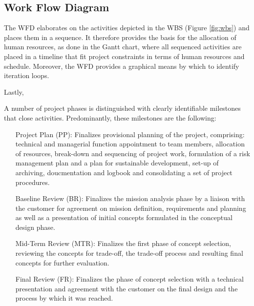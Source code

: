 \subsection{Work Flow Diagram}\label{cha:WFD}
The WFD elaborates on the activities depicted in the WBS (Figure \ref{fig:wbs}) and places them in a sequence. It therefore provides the basis for the allocation of human resources, as done in the Gantt chart, where all sequenced activities are placed in a timeline that fit project constraints in terms of human resources and schedule. Moreover, the WFD provides a graphical means by which to identify iteration loops. 

Lastly, 

A number of project phases is distinguished with clearly identifiable milestones that close activities. Predominantly, these milestones are the following:
\begin{itemize}
\item[Project Plan (PP):] Finalizes provisional planning of the project, comprising: technical and managerial function appointment to team members, allocation of resources, break-down and sequencing of project work, formulation of a risk management plan and a plan for sustainable development, set-up of archiving, doucmentation and logbook and consolidating a set of project procedures.
\item[Baseline Review (BR):] Finalizes the mission analysis phase by a liaison with the customer for agreement on mission definition, requirements and planning as well as a presentation of initial concepts formulated in the conceptual design phase.
\item[Mid-Term Review (MTR):] Finalizes the first phase of concept selection, reviewing the concepts for trade-off, the trade-off process and resulting final concepts for further evaluation.
\item[Final Review (FR):] Finalizes the phase of concept selection with a technical presentation and agreement with the customer on the final design and the process by which it was reached. 
\end{itemize}

